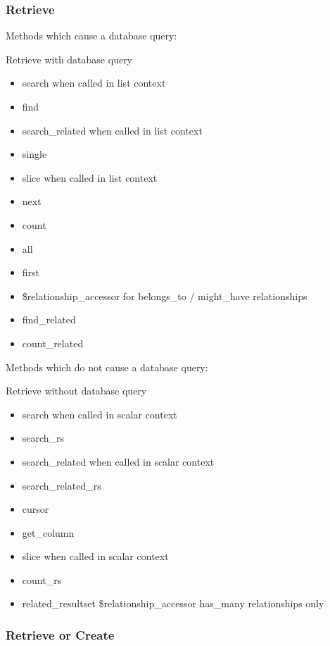 \subsubsection{Retrieve}

Methods which cause a database query:

\begin{frame}{Retrieve with database query}
\begin{itemize}
\item search when called in list context
\item find
\item search\_related when called in list context
\item single
\item slice when called in list context
\item next
\item count
\item all
\item first
\item \$relationship\_accessor for belongs\_to / might\_have relationships
\item find\_related
\item count\_related
\end{itemize}
\end{frame}

Methods which do not cause a database query:

\begin{frame}{Retrieve without database query}
\begin{itemize}
\item search when called in scalar context
\item search\_rs
\item search\_related when called in scalar context
\item search\_related\_rs
\item cursor
\item get\_column
\item slice when called in scalar context
\item count\_rs
\item related\_resultset
\$relationship\_accessor has\_many relationships only
\end{itemize}
\end{frame}

\subsubsection{Retrieve or Create}

